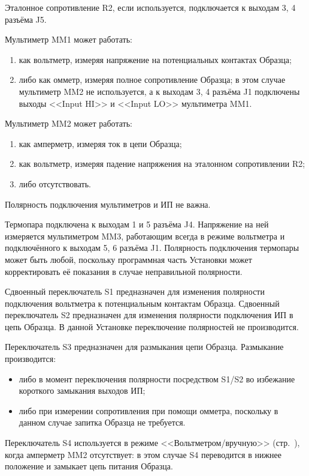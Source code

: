 \documentclass[12pt, a4paper, twocolumn]{report}
\begin{document}
Эталонное сопротивление R2, если используется, подключается к выходам 3, 4 разъёма J5.

Мультиметр MM1 может работать:

\begin{enumerate}
\item как вольтметр, измеряя напряжение на потенциальных контактах Образца;
\item либо как омметр, измеряя полное сопротивление Образца; в этом случае мультиметр MM2 не используется, а к выходам 3, 4 разъёма J1 подключены выходы <<Input HI>> и <<Input LO>> мультиметра MM1.
\end{enumerate}

Мультиметр MM2 может работать:

\begin{enumerate}
\item как амперметр, измеряя ток в цепи Образца;
\item как вольтметр, измеряя падение напряжения на эталонном сопротивлении R2;
\item либо отсутствовать.
\end{enumerate}

Полярность подключения мультиметров и ИП не важна.

Термопара подключена к выходам 1 и 5 разъёма J4. Напряжение на ней измеряется мультиметром MM3, работающим всегда в режиме вольтметра и подключённого к выходам 5, 6 разъёма J1. Полярность подключения термопары может быть любой, поскольку программная часть Установки может корректировать её показания в случае неправильной полярности.

Сдвоенный переключатель S1 предназначен для изменения полярности подключения вольтметра к потенциальным контактам Образца. Сдвоенный переключатель S2 предназначен для изменения полярности подключения ИП в цепь Образца. В данной Установке переключение полярностей не производится.

Переключатель S3 предназначен для размыкания цепи Образца. Размыкание производится:

\begin{itemize}
\item либо в момент переключения полярности посредством S1/S2 во избежание короткого замыкания выходов ИП;
\item либо при измерении сопротивления при помощи омметра, поскольку в данном случае запитка Образца не требуется.
\end{itemize}

Переключатель S4 используется в режиме <<Вольтметром/вручную>> (стр.~\pageref{sec_voltmeter_manually}), когда амперметр MM2 отсутствует: в этом случае S4 переводится в нижнее положение и замыкает цепь питания Образца.
\end{document}
